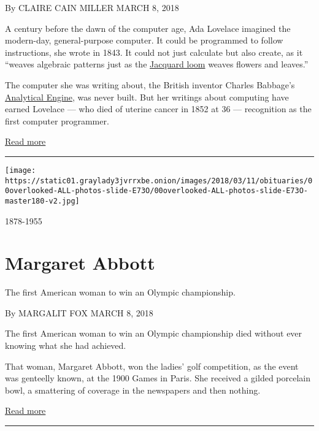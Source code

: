 By CLAIRE CAIN MILLER MARCH 8, 2018

A century before the dawn of the computer age, Ada Lovelace imagined the
modern-day, general-purpose computer. It could be programmed to follow
instructions, she wrote in 1843. It could not just calculate but also
create, as it ``weaves algebraic patterns just as the
\href{https://en.wikipedia.org/wiki/Jacquard_loom}{Jacquard loom} weaves
flowers and leaves.''

The computer she was writing about, the British inventor Charles
Babbage's
\href{http://www.nytimes3xbfgragh.onion/interactive/2011/11/07/science/before-its-time-machine.html}{Analytical
Engine}, was never built. But her writings about computing have earned
Lovelace --- who died of uterine cancer in 1852 at 36 --- recognition as
the first computer programmer.

\href{https://www.nytimes3xbfgragh.onion/interactive/2018/obituaries/overlooked-ada-lovelace.html}{Read
more}

\begin{center}\rule{0.5\linewidth}{\linethickness}\end{center}

\texttt{[image: https://static01.graylady3jvrrxbe.onion/images/2018/03/11/obituaries/00overlooked-ALL-photos-slide-E73O/00overlooked-ALL-photos-slide-E73O-master180-v2.jpg]}

1878-1955

\hypertarget{margaret-abbott}{%
\section{Margaret Abbott}\label{margaret-abbott}}

The first American woman to win an Olympic championship.

By MARGALIT FOX MARCH 8, 2018

The first American woman to win an Olympic championship died without
ever knowing what she had achieved.

That woman, Margaret Abbott, won the ladies' golf competition, as the
event was genteelly known, at the 1900 Games in Paris. She received a
gilded porcelain bowl, a smattering of coverage in the newspapers and
then nothing.

\href{https://www.nytimes3xbfgragh.onion/interactive/2018/obituaries/overlooked-margaret-abbott.html}{Read
more}

\begin{center}\rule{0.5\linewidth}{\linethickness}\end{center}

